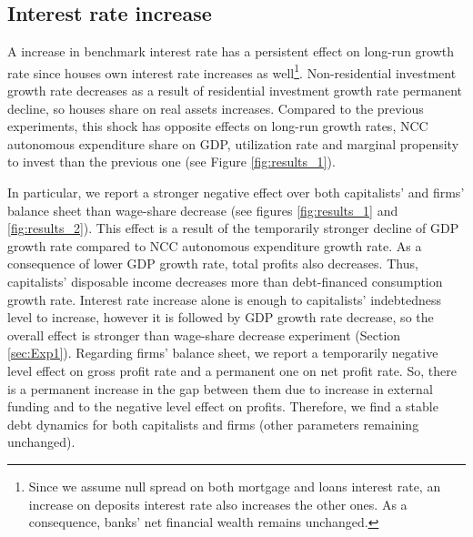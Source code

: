 \documentclass[11pt]{article}
\begin{document}
\subsection{Interest rate increase}
\label{sec:orgb573a85}
\label{sec:Exp3}

A increase in benchmark interest rate  has a persistent effect on long-run growth rate since houses own interest rate increases as well\footnote{Since we assume null spread on both mortgage and loans interest rate, an increase on deposits interest rate also increases the other ones. As a consequence, banks' net financial wealth remains unchanged.}.
Non-residential investment growth rate decreases as a result of residential investment growth rate permanent decline, so houses share on real assets increases.
Compared to the previous experiments, this shock has opposite effects on long-run growth rates, NCC autonomous expenditure share on GDP, utilization rate and marginal propensity to invest  than the previous one (see Figure \ref{fig:results_1}).


In particular, we report a stronger negative effect over both capitalists' and firms' balance sheet than wage-share decrease (see figures \ref{fig:results_1} and \ref{fig:results_2}).
This effect is a result of the temporarily stronger decline of GDP growth rate compared to NCC autonomous expenditure growth rate.
As a consequence of lower GDP growth rate, total profits also decreases.
Thus, capitalists' disposable income decreases more than debt-financed consumption growth rate.
Interest rate increase alone is enough to capitalists' indebtedness level to increase, however it is followed by GDP growth rate decrease, so the overall effect is stronger than wage-share decrease experiment (Section \ref{sec:Exp1}).
Regarding firms' balance sheet, we report a temporarily negative level effect on gross profit rate and a permanent one on net profit rate. 
So, there is a permanent increase in the gap between them due to increase in external funding and to the negative level effect on profits.
Therefore, we find a stable debt dynamics for both capitalists and firms (other parameters remaining unchanged).
\end{document}
